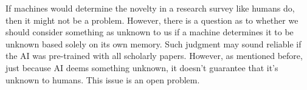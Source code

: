 
If machines would determine the novelty in a research survey like humans do, then it might not be a problem. However, there is a question as to whether we should consider something as unknown to us if a machine determines it to be unknown based solely on its own memory. Such judgment may sound reliable if the AI was pre-trained with all scholarly papers. However, as mentioned before, just because AI deems something unknown, it doesn't guarantee that it's unknown to humans. This issue is an open problem.



